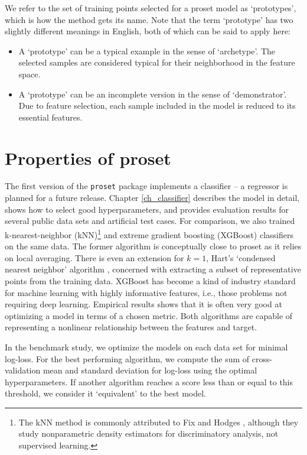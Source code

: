 %
We refer to the set of training points selected for a proset model as `prototypes', which is how the method gets its name.
Note that the term `prototype' has two slightly different meanings in English, both of which can be said to apply here:
%
\begin{itemize}
\item A `prototype' can be a typical example in the sense of `archetype'.
The selected samples are considered typical for their neighborhood in the feature space.
%
\item A `prototype' can be an incomplete version in the sense of `demonstrator'.
Due to feature selection, each sample included in the model is reduced to its essential features.
\end{itemize}
%
\section{Properties of proset}
\label{sec_properties}
%
The first version of the \texttt{proset} package implements a classifier -- a regressor is planned for a future release.
Chapter \ref{ch_classifier} describes the model in detail, shows how to select good hyperparameters, and provides evaluation results for several public data sets and artificial test cases.
For comparison, we also trained k-nearest-neighbor (kNN)\footnote{
The kNN method is commonly attributed to Fix and Hodges \cite{Fix_51}, although they study nonparametric density estimators for discriminatory analysis, not supervised learning.
}
and extreme gradient boosting (XGBoost) \cite{Chen_16} classifiers on the same data.
The former algorithm is conceptually close to proset as it relies on local averaging.
There is even an extension for $k=1$, Hart's `condensed nearest neighbor' algorithm \cite{Hart_68}, concerned with extracting a subset of representative points from the training data.
XGBoost has become a kind of industry standard for machine learning with highly informative features, i.e., those problems not requiring deep learning.
Empirical results shows that it is often very good at optimizing a model in terms of a chosen metric.
Both algorithms are capable of representing a nonlinear relationship between the features and target.\par
%
In the benchmark study, we optimize the models on each data set for minimal log-loss.
For the best performing algorithm, we compute the sum of cross-validation mean and standard deviation for log-loss using the optimal hyperparameters.
If another algorithm reaches a score less than or equal to this threshold, we consider it `equivalent' to the best model.
